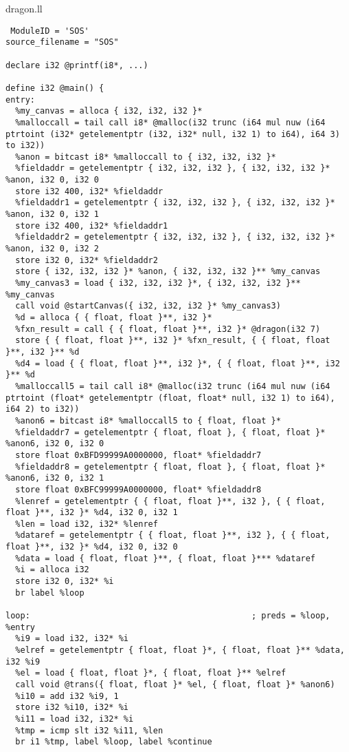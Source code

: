\documentclass[main.tex]{subfiles}
\begin{document}
{\tiny
\colorbox{green!30}{dragon.ll}
\begin{lstlisting}
 ModuleID = 'SOS'
source_filename = "SOS"

declare i32 @printf(i8*, ...)

define i32 @main() {
entry:
  %my_canvas = alloca { i32, i32, i32 }*
  %malloccall = tail call i8* @malloc(i32 trunc (i64 mul nuw (i64 ptrtoint (i32* getelementptr (i32, i32* null, i32 1) to i64), i64 3) to i32))
  %anon = bitcast i8* %malloccall to { i32, i32, i32 }*
  %fieldaddr = getelementptr { i32, i32, i32 }, { i32, i32, i32 }* %anon, i32 0, i32 0
  store i32 400, i32* %fieldaddr
  %fieldaddr1 = getelementptr { i32, i32, i32 }, { i32, i32, i32 }* %anon, i32 0, i32 1
  store i32 400, i32* %fieldaddr1
  %fieldaddr2 = getelementptr { i32, i32, i32 }, { i32, i32, i32 }* %anon, i32 0, i32 2
  store i32 0, i32* %fieldaddr2
  store { i32, i32, i32 }* %anon, { i32, i32, i32 }** %my_canvas
  %my_canvas3 = load { i32, i32, i32 }*, { i32, i32, i32 }** %my_canvas
  call void @startCanvas({ i32, i32, i32 }* %my_canvas3)
  %d = alloca { { float, float }**, i32 }*
  %fxn_result = call { { float, float }**, i32 }* @dragon(i32 7)
  store { { float, float }**, i32 }* %fxn_result, { { float, float }**, i32 }** %d
  %d4 = load { { float, float }**, i32 }*, { { float, float }**, i32 }** %d
  %malloccall5 = tail call i8* @malloc(i32 trunc (i64 mul nuw (i64 ptrtoint (float* getelementptr (float, float* null, i32 1) to i64), i64 2) to i32))
  %anon6 = bitcast i8* %malloccall5 to { float, float }*
  %fieldaddr7 = getelementptr { float, float }, { float, float }* %anon6, i32 0, i32 0
  store float 0xBFD99999A0000000, float* %fieldaddr7
  %fieldaddr8 = getelementptr { float, float }, { float, float }* %anon6, i32 0, i32 1
  store float 0xBFC99999A0000000, float* %fieldaddr8
  %lenref = getelementptr { { float, float }**, i32 }, { { float, float }**, i32 }* %d4, i32 0, i32 1
  %len = load i32, i32* %lenref
  %dataref = getelementptr { { float, float }**, i32 }, { { float, float }**, i32 }* %d4, i32 0, i32 0
  %data = load { float, float }**, { float, float }*** %dataref
  %i = alloca i32
  store i32 0, i32* %i
  br label %loop

loop:                                             ; preds = %loop, %entry
  %i9 = load i32, i32* %i
  %elref = getelementptr { float, float }*, { float, float }** %data, i32 %i9
  %el = load { float, float }*, { float, float }** %elref
  call void @trans({ float, float }* %el, { float, float }* %anon6)
  %i10 = add i32 %i9, 1
  store i32 %i10, i32* %i
  %i11 = load i32, i32* %i
  %tmp = icmp slt i32 %i11, %len
  br i1 %tmp, label %loop, label %continue


\end{lstlisting}}
\end{document}

